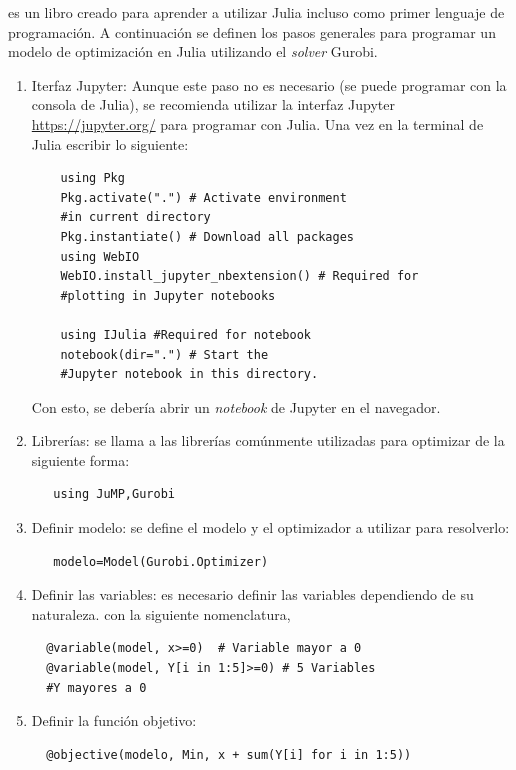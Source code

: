 \cite{https://introajulia.org/} es un libro creado para aprender a utilizar Julia incluso como primer lenguaje de programación. A continuación se definen los pasos generales para programar un modelo de optimización en Julia utilizando el \textit{solver} Gurobi. 


\begin{enumerate}
    \item Iterfaz Jupyter: Aunque este paso no es necesario (se puede programar con la consola de Julia), se recomienda utilizar la interfaz Jupyter \url{https://jupyter.org/} para programar con Julia. Una vez en la terminal de Julia escribir lo siguiente:
    \begin{lstlisting}
    using Pkg
    Pkg.activate(".") # Activate environment 
    #in current directory
    Pkg.instantiate() # Download all packages
    using WebIO
    WebIO.install_jupyter_nbextension() # Required for 
    #plotting in Jupyter notebooks

    using IJulia #Required for notebook
    notebook(dir=".") # Start the 
    #Jupyter notebook in this directory.
    \end{lstlisting}
    Con esto, se debería abrir un \textit{notebook} de Jupyter en el navegador.
    
   \item Librerías: se llama a las librerías comúnmente utilizadas para optimizar de la siguiente forma:
   \begin{lstlisting}
   using JuMP,Gurobi
   \end{lstlisting}
   
   \item Definir modelo: se define el modelo y el optimizador a utilizar para resolverlo:
   \begin{lstlisting}
   modelo=Model(Gurobi.Optimizer)
   \end{lstlisting}
   
   \item Definir las variables: es necesario definir las variables dependiendo de su naturaleza. con la siguiente nomenclatura,
   \begin{lstlisting}
  @variable(model, x>=0)  # Variable mayor a 0
  @variable(model, Y[i in 1:5]>=0) # 5 Variables 
  #Y mayores a 0
   \end{lstlisting}
   
  \item Definir la función objetivo:
  \begin{lstlisting}
  @objective(modelo, Min, x + sum(Y[i] for i in 1:5)) 
   \end{lstlisting}
  

\end{enumerate}
